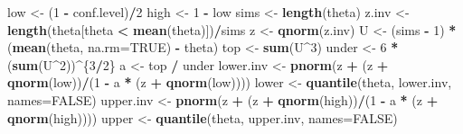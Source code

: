 \documentclass[
]{article}
\newenvironment{Shaded}{\begin{snugshade}}{\end{snugshade}}
\newcommand{\AttributeTok}[1]{\textcolor[rgb]{0.13,0.29,0.53}{#1}}
\newcommand{\ConstantTok}[1]{\textcolor[rgb]{0.56,0.35,0.01}{#1}}
\newcommand{\DecValTok}[1]{\textcolor[rgb]{0.00,0.00,0.81}{#1}}
\newcommand{\FunctionTok}[1]{\textcolor[rgb]{0.13,0.29,0.53}{\textbf{#1}}}
\newcommand{\NormalTok}[1]{#1}
\newcommand{\OtherTok}[1]{\textcolor[rgb]{0.56,0.35,0.01}{#1}}
\newcommand{\SpecialCharTok}[1]{\textcolor[rgb]{0.81,0.36,0.00}{\textbf{#1}}}
\begin{document}
\begin{Shaded}
\begin{Highlighting}[]
\NormalTok{  low }\OtherTok{\textless{}{-}}\NormalTok{ (}\DecValTok{1} \SpecialCharTok{{-}}\NormalTok{ conf.level)}\SpecialCharTok{/}\DecValTok{2}
\NormalTok{  high }\OtherTok{\textless{}{-}} \DecValTok{1} \SpecialCharTok{{-}}\NormalTok{ low}
\NormalTok{  sims }\OtherTok{\textless{}{-}} \FunctionTok{length}\NormalTok{(theta)}
\NormalTok{  z.inv }\OtherTok{\textless{}{-}} \FunctionTok{length}\NormalTok{(theta[theta }\SpecialCharTok{\textless{}} \FunctionTok{mean}\NormalTok{(theta)])}\SpecialCharTok{/}\NormalTok{sims}
\NormalTok{  z }\OtherTok{\textless{}{-}} \FunctionTok{qnorm}\NormalTok{(z.inv)}
\NormalTok{  U }\OtherTok{\textless{}{-}}\NormalTok{ (sims }\SpecialCharTok{{-}} \DecValTok{1}\NormalTok{) }\SpecialCharTok{*}\NormalTok{ (}\FunctionTok{mean}\NormalTok{(theta, }\AttributeTok{na.rm=}\ConstantTok{TRUE}\NormalTok{) }\SpecialCharTok{{-}}\NormalTok{ theta)}
\NormalTok{  top }\OtherTok{\textless{}{-}} \FunctionTok{sum}\NormalTok{(U}\SpecialCharTok{\^{}}\DecValTok{3}\NormalTok{)}
\NormalTok{  under }\OtherTok{\textless{}{-}} \DecValTok{6} \SpecialCharTok{*}\NormalTok{ (}\FunctionTok{sum}\NormalTok{(U}\SpecialCharTok{\^{}}\DecValTok{2}\NormalTok{))}\SpecialCharTok{\^{}}\NormalTok{\{}\DecValTok{3}\SpecialCharTok{/}\DecValTok{2}\NormalTok{\}}
\NormalTok{  a }\OtherTok{\textless{}{-}}\NormalTok{ top }\SpecialCharTok{/}\NormalTok{ under}
\NormalTok{  lower.inv }\OtherTok{\textless{}{-}}  \FunctionTok{pnorm}\NormalTok{(z }\SpecialCharTok{+}\NormalTok{ (z }\SpecialCharTok{+} \FunctionTok{qnorm}\NormalTok{(low))}\SpecialCharTok{/}\NormalTok{(}\DecValTok{1} \SpecialCharTok{{-}}\NormalTok{ a }\SpecialCharTok{*}\NormalTok{ (z }\SpecialCharTok{+} \FunctionTok{qnorm}\NormalTok{(low))))}
\NormalTok{  lower }\OtherTok{\textless{}{-}} \FunctionTok{quantile}\NormalTok{(theta, lower.inv, }\AttributeTok{names=}\ConstantTok{FALSE}\NormalTok{)}
\NormalTok{  upper.inv }\OtherTok{\textless{}{-}}  \FunctionTok{pnorm}\NormalTok{(z }\SpecialCharTok{+}\NormalTok{ (z }\SpecialCharTok{+} \FunctionTok{qnorm}\NormalTok{(high))}\SpecialCharTok{/}\NormalTok{(}\DecValTok{1} \SpecialCharTok{{-}}\NormalTok{ a }\SpecialCharTok{*}\NormalTok{ (z }\SpecialCharTok{+} \FunctionTok{qnorm}\NormalTok{(high))))}
\NormalTok{  upper }\OtherTok{\textless{}{-}} \FunctionTok{quantile}\NormalTok{(theta, upper.inv, }\AttributeTok{names=}\ConstantTok{FALSE}\NormalTok{)}
  

\end{Highlighting}
\end{Shaded}
\end{document}

